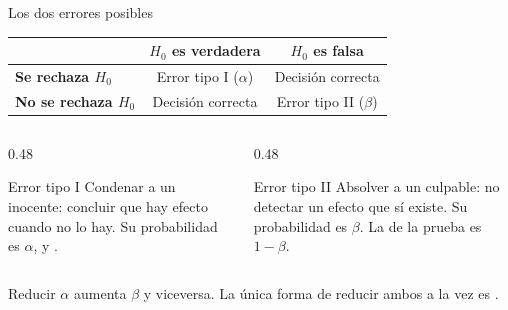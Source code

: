 \documentclass[aspectratio=169,10pt]{beamer}
\begin{document}
\begin{frame}{Los dos errores posibles}
  \footnotesize
  \begin{center}
  \begin{tabular}{@{}lcc@{}}
    \toprule
    & \textbf{$H_0$ es verdadera} & \textbf{$H_0$ es falsa} \\
    \midrule
    \textbf{Se rechaza $H_0$} &
      \cellcolor{uniCrema}Error tipo I ($\alpha$) & Decisión correcta \\
    \textbf{No se rechaza $H_0$} &
      Decisión correcta & \cellcolor{uniCrema}Error tipo II ($\beta$) \\
    \bottomrule
  \end{tabular}
  \end{center}

  \vspace{0.25cm}
  \begin{columns}[T,onlytextwidth]
    \begin{column}{0.48\textwidth}
      \begin{alertblock}{Error tipo I}
        \footnotesize
        Condenar a un inocente: concluir que hay efecto cuando no lo hay. Su
        probabilidad es $\alpha$, y .
      \end{alertblock}
    \end{column}
    \begin{column}{0.48\textwidth}
      \begin{block}{Error tipo II}
        \footnotesize
        Absolver a un culpable: no detectar un efecto que sí existe. Su
        probabilidad es $\beta$. La  de la prueba es
        $1-\beta$.
      \end{block}
    \end{column}
  \end{columns}

  \vspace{0.15cm}
  {\scriptsize\color{uniGris} Reducir $\alpha$ aumenta $\beta$ y viceversa. La
  única forma de reducir ambos a la vez es .}
\end{frame}
\end{document}
